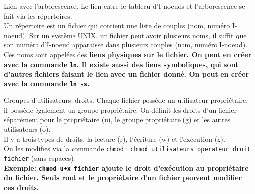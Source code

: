 \documentclass[french, 11pt]{article}
\begin{document}
\begin{defi}{Lien avec l'arborescence.}{}
    Le lien entre le tableau d'I-noeuds et l'arborescence se fait via les répertoires.\\
    Un répertoire est un fichier qui contient une liste de couples (nom, numéro I-noeud).\n
    Sur un système UNIX, un fichier peut avoir plusieurs noms, il suffit que son numéro d'I-noeud apparaisse dans plusieurs couples (nom, numéro I-noeud).\\
    Ces noms sont appelées des \bf{liens} physiques sur le fichier. On peut en créer avec la commande \texttt{ln}.\n
    Il existe aussi des liens symboliques, qui sont d'autres fichiers faisant le lien avec un fichier donné. On peut en créer avec la commande \texttt{ln -s}.
\end{defi}

\begin{defi}{Groupes d'utilisateurs: droits.}{}
    Chaque fichier possède un utilisateur propriétaire, il possède également un groupe propriétaire.\n
    On définit les droits d'un fichier séparément pour le propriétaire (u), le groupe propriétaire (g) et les autres utilisateurs (o).\\
    Il y a trois types de droits, la lecture (r), l'écriture (w) et l'exécution (x).\\
    On les modifies via la commande \texttt{chmod} : \texttt{chmod utilisateurs operateur droit fichier} (sans espaces).\\
    \bf{Exemple:} \texttt{chmod u+x fichier} ajoute le droit d'exécution au propriétaire du fichier.\n
    Seuls root et le propriétaire d'un fichier peuvent modifier ces droits.
\end{defi}
\end{document}

